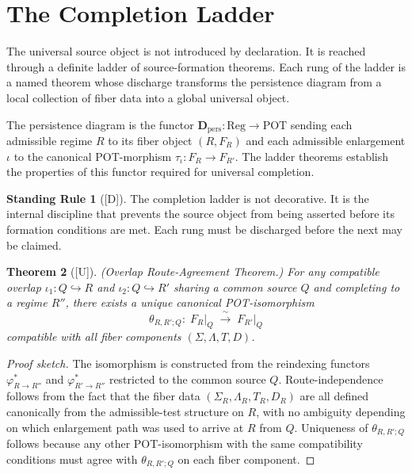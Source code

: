\documentclass[12pt,oneside]{amsbook}
\theoremstyle{plain}
\newtheorem{theorem}{Theorem}[section]
\theoremstyle{definition}
\newtheorem{standingrule}[theorem]{Standing Rule}
\theoremstyle{remark}
\newcommand{\status}[1]{\textup{[#1]}}
\begin{document}
\section{The Completion Ladder}
\label{sec:ladder}

The universal source object is not introduced by declaration.  It is
reached through a definite ladder of source-formation theorems.  Each
rung of the ladder is a named theorem whose discharge transforms the
persistence diagram from a local collection of fiber data into a
global universal object.

The persistence diagram is the functor
$\mathbf{D}_{\mathrm{pers}}: \mathrm{Reg} \to \mathrm{POT}$ sending
each admissible regime $R$ to its fiber object $(R, F_R)$ and each
admissible enlargement $\iota$ to the canonical POT-morphism
$\tau_\iota: F_R \to F_{R'}$.  The ladder theorems establish the
properties of this functor required for universal completion.

\begin{standingrule}[\status{D}]\label{sr:ladder-not-decorative}
The completion ladder is not decorative.  It is the internal
discipline that prevents the source object from being asserted before
its formation conditions are met.  Each rung must be discharged before
the next may be claimed.
\end{standingrule}

\begin{theorem}[\status{U}]\label{thm:ORA}
\textup{(Overlap Route-Agreement Theorem.)}  For any compatible overlap
$\iota_1: Q \hookrightarrow R$ and $\iota_2: Q \hookrightarrow R'$
sharing a common source $Q$ and completing to a regime $R''$, there
exists a unique canonical POT-isomorphism
\[
  \theta_{R,R';Q}:\; F_R\big|_Q \;\xrightarrow{\;\sim\;}\; F_{R'}\big|_Q
\]
compatible with all fiber components $(\Sigma, \Lambda, T, D)$.
\end{theorem}

\begin{proof}[Proof sketch]
The isomorphism is constructed from the reindexing functors
$\varphi^*_{R \to R''}$ and $\varphi^*_{R' \to R''}$ restricted to the
common source $Q$.  Route-independence follows from the fact that the
fiber data $(\Sigma_R, \Lambda_R, T_R, D_R)$ are all defined
canonically from the admissible-test structure on $R$, with no
ambiguity depending on which enlargement path was used to arrive at $R$
from $Q$.  Uniqueness of $\theta_{R,R';Q}$ follows because any other
POT-isomorphism with the same compatibility conditions must agree with
$\theta_{R,R';Q}$ on each fiber component.
\end{proof}
\end{document}
